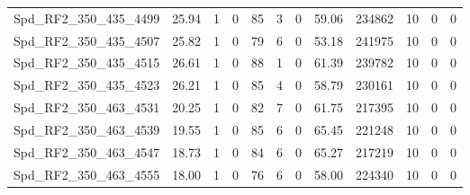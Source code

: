 \begin{longtable}[c]{@{}lrrrrrrrrrrr@{}}
Spd\_RF2\_350\_435\_4499      & 25.94                  & 1                       & 0                       & 85                     & 3                       & 0                       & 59.06                   & 234862                   & 10                       & 0                        & 0                        \\
Spd\_RF2\_350\_435\_4507      & 25.82                  & 1                       & 0                       & 79                     & 6                       & 0                       & 53.18                   & 241975                   & 10                       & 0                        & 0                        \\
Spd\_RF2\_350\_435\_4515      & 26.61                  & 1                       & 0                       & 88                     & 1                       & 0                       & 61.39                   & 239782                   & 10                       & 0                        & 0                        \\
Spd\_RF2\_350\_435\_4523      & 26.21                  & 1                       & 0                       & 85                     & 4                       & 0                       & 58.79                   & 230161                   & 10                       & 0                        & 0                        \\
Spd\_RF2\_350\_463\_4531      & 20.25                  & 1                       & 0                       & 82                     & 7                       & 0                       & 61.75                   & 217395                   & 10                       & 0                        & 0                        \\
Spd\_RF2\_350\_463\_4539      & 19.55                  & 1                       & 0                       & 85                     & 6                       & 0                       & 65.45                   & 221248                   & 10                       & 0                        & 0                        \\
Spd\_RF2\_350\_463\_4547      & 18.73                  & 1                       & 0                       & 84                     & 6                       & 0                       & 65.27                   & 217219                   & 10                       & 0                        & 0                        \\
Spd\_RF2\_350\_463\_4555      & 18.00                  & 1                       & 0                       & 76                     & 6                       & 0                       & 58.00                   & 224340                   & 10                       & 0                        & 0                        \\

\end{longtable}
